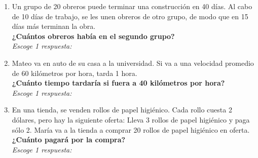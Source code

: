 \documentclass[11pt]{book}
\begin{document}
\begin{enumerate}%
  \item Un grupo de 20 obreros puede terminar una
        construcción en 40 días. Al cabo de 10 días de trabajo,
        se les unen obreros de otro grupo, de modo que en 15 días
        más terminan la obra.\\
        \textbf{¿Cuántos obreros había en el segundo grupo?}\\
        \emph{Escoge 1 respuesta:}


  \item Mateo va en auto de su casa a la universidad. Si va a una velocidad promedio de 60 kilómetros por hora, tarda 1 hora.\\
        \textbf{¿Cuánto tiempo tardaría si fuera a 40 kilómetros por hora?}\\
        \emph{Escoge 1 respuesta:}


  \item En una tienda, se venden rollos de papel higiénico. Cada rollo cuesta 2 dólares, pero hay la siguiente oferta:
        Lleva 3 rollos de papel higiénico y paga s\'olo 2.
        María va a la tienda a comprar 20 rollos de papel higiénico en oferta.\\
        \textbf{¿Cuánto pagará por la compra?}\\
        \emph{Escoge 1 respuesta:}



\end{enumerate}
\end{document}
